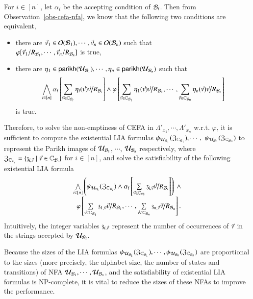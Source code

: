 For $i \in [n]$, let $\alpha_i$ be the accepting condition of $\mathcal{B}_i$. 
Then from Observation~\ref{obs-cefa-nfa}, we know that the following two conditions are equivalent, 
\begin{itemize}

\item there are  $\vec{v}_1 \in \mathcal{O}(\mathcal{B}_1), \cdots, \vec{v}_n \in \mathcal{O}(\mathcal{B}_n)$ such that \\$\varphi[\vec{v}_1/R_{\mathcal{B}_{1}}, \cdots, \vec{v}_n/R_{\mathcal{B}_{n}}]$ is true, 
\item 
there are $\eta_1 \in \mathsf{parikh}(\mathcal{U}_{\mathcal{B}_1}), \cdots, \eta_n \in \mathsf{parikh}(\mathcal{U}_{\mathcal{B}_n})$ such that 
\[
\bigwedge \limits_{i \in [n]} \alpha_i\left[ \sum \limits_{\vec{v} \in \mathbb{C}_{\mathcal{B}_i}} \eta_i(\vec{v}) \vec{v} \big{/}R_{\mathcal{B}_i}  \right] \wedge \varphi \left[\sum \limits_{\vec{v} \in \mathbb{C}_{\mathcal{B}_1}} \eta_1(\vec{v}) \vec{v} \big{/}R_{\mathcal{B}_1}, \cdots, \sum \limits_{\vec{v} \in \mathbb{C}_{\mathcal{B}_n}} \eta_n(\vec{v}) \vec{v} \big{/}R_{\mathcal{B}_n} \right]
\]
is true. 
\end{itemize}

Therefore, to solve the non-emptiness of CEFA in $\Lambda'_{x_1}, \cdots, \Lambda'_{x_n}$ w.r.t. $\varphi$, it is sufficient to compute the existential LIA formulas $\psi_{\mathcal{U}_{\mathcal{B}_1}}(\mathfrak{Z}_{\mathbb{C}_{\mathcal{B}_1}}), \cdots, $ $\psi_{\mathcal{U}_{\mathcal{B}_n}}(\mathfrak{Z}_{\mathbb{C}_{\mathcal{B}_n}})$ to represent the Parikh images of $\mathcal{U}_{\mathcal{B}_1}$, $\cdots$, $\mathcal{U}_{\mathcal{B}_n}$ respectively, where $\mathfrak{Z}_{\mathbb{C}_{\mathcal{B}_i}} = \{\mathfrak{z}_{i,\vec{v}} \mid \vec{v} \in \mathbb{C}_{\mathcal{B}_i}\}$ for $i \in [n]$, and solve the satisfiability of the following existential LIA formula
\[
\begin{array}{l}
\bigwedge \limits_{i \in [n]} \left(\psi_{\mathcal{U}_{\mathcal{B}_i}}(\mathfrak{Z}_{\mathbb{C}_{\mathcal{B}_i}}) \wedge \alpha_i\left[\sum\limits_{\vec{v} \in \mathbb{C}_{\mathcal{B}_i}} \mathfrak{z}_{i, \vec{v}} \vec{v} \big{/}R_{\mathcal{B}_i}  \right] \right)\  \wedge \\
\ \ \varphi \left[ \sum\limits_{\vec{v} \in \mathbb{C}_{\mathcal{B}_1}} \mathfrak{z}_{1, \vec{v}} \vec{v} \big{/}R_{\mathcal{B}_1}, \cdots, \sum\limits_{\vec{v} \in \mathbb{C}_{\mathcal{B}_n}} \mathfrak{z}_{n, \vec{v}} \vec{v} \big{/}R_{\mathcal{B}_n} \right].
\end{array}
\]
Intuitively, the integer variables $\mathfrak{z}_{i, \vec{v}}$ represent the number of occurrences of $\vec{v}$ in the strings accepted by $\mathcal{U}_{\mathcal{B}_i}$.

Because the sizes of the LIA formulas $\psi_{\mathcal{U}_{\mathcal{B}_1}}(\mathfrak{Z}_{\mathbb{C}_{\mathcal{B}_1}}), \cdots, \psi_{\mathcal{U}_{\mathcal{B}_n}}(\mathfrak{Z}_{\mathbb{C}_{\mathcal{B}_n}})$ are proportional to the sizes (more precisely, the alphabet size, the number of states and transitions) of NFA $\mathcal{U}_{\mathcal{B}_1}, \cdots, \mathcal{U}_{\mathcal{B}_n}$, and the satisfiability of existential LIA formulas is NP-complete, it is vital to reduce the sizes of these NFAs to improve the performance.

